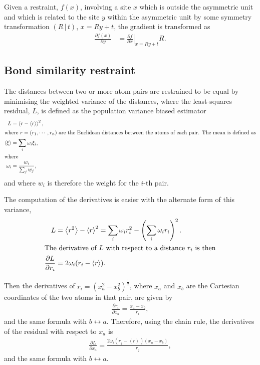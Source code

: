 \documentclass[11pt]{article}
\newcommand{\mean}[1]{\left\langle #1 \right\rangle}
\newcommand{\sym}[2]{\left( #1\,\vert\, #2 \right)}
\newcommand{\partialder}[2]{\frac{\partial #1}{\partial #2}}
\begin{document}
Given a restraint, $f(x)$, involving a site $x$ which is outside the asymmetric unit and which is related to the site $y$ within the asymmetric unit by some symmetry transformation $\sym{R}{t}$,  $x=Ry+t$, the gradient is transformed as
\begin{align}
\partialder{f(x)}{y}  &= \left.\partialder{f}{x}\right|_{x=Ry+t} R.
\label{eqn:partialder:transform:under:symmetry}
\end{align}

\subsection{Bond similarity restraint}

The distances between two or more atom pairs are restrained to be equal by minimising the weighted variance of the distances, where the least-squares residual, $L$, is defined as the population variance biased estimator
\begin{align}
\label{eqn:bond_similarity}
L &= \mean{r - \mean{r}}^2,\\
\intertext{where $r=(r_1, \cdots, r_n)$ are the Euclidean distances between the atoms of each pair. The mean is defined as}
\mean{\xi} &= \sum_i \omega_i \xi_i, \\
\intertext{where}
\omega_i &= \frac{w_i}{\sum_j w_j},
\end{align}
and where $w_i$ is therefore the weight for the $i$-th pair.

The computation of the derivatives is easier with the alternate form of this variance, 
\begin{align}
L &= \mean{r^2} - \mean{r}^2 = \sum_i \omega_i r_i^2 - \left(\sum_i \omega_i r_i\right)^2.\\
\intertext{The derivative of $L$ with respect to a distance $r_i$ is then}
\partialder{L}{r_i} &= 2 \omega_i(r_i - \mean{r}).
\end{align}

Then the derivatives of $r_i = (x_a^2 - x_b^2)^\frac{1}{2}$, where $x_a$ and $x_b$ are the Cartesian coordinates of the two atoms in that pair, are given by
\begin{align}
\partialder{r_i}{x_a} = \frac{x_a - x_b}{r_i},
\end{align}
and the same formula with $b \leftrightarrow a$.
Therefore, using the chain rule, the derivatives of the residual with respect to $x_a$ is
\begin{align}
\partialder{L}{x_a} = \frac{2 \omega_i (r_j - \mean{r})(x_a - x_b)}{r_j},
\end{align}
and the same formula with $b \leftrightarrow a$.
\end{document}
